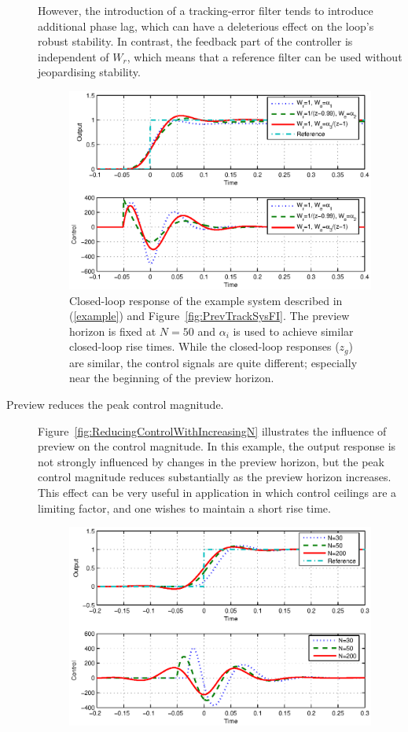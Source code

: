 \documentclass[a4paper,12pt]{article}
\theoremstyle{remark}
\begin{document}
\begin{description}
However, the introduction of a tracking-error filter tends to introduce additional phase lag, which can have a deleterious effect on the loop's robust stability. In contrast, the feedback part of the controller is independent of $W_r$, which means that a reference filter can be used without jeopardising stability.  
\begin{figure}
\begin{center}
\includegraphics[width=\columnwidth]{./Fig_11.eps}
\end{center}	
\caption{Closed-loop response of the example system described in (\ref{example}) and Figure~\ref{fig:PrevTrackSysFI}. The preview horizon is fixed at $N=50$ and $\alpha_i$ is used to achieve similar closed-loop rise times. While the closed-loop responses ($z_g$) are similar, the control signals are quite different; especially near the beginning of the preview horizon. \label{fig:CompWzWrNormForSimilarResp}}
\end{figure}
\item[Preview reduces the peak control magnitude.] 
Figure~\ref{fig:ReducingControlWithIncreasingN} illustrates the influence of preview on the control magnitude. In this example, the output response is not strongly influenced by changes in the preview horizon, but the peak control magnitude reduces substantially as the preview horizon increases. This effect can be very useful in application in which control ceilings are a limiting factor, and one wishes to maintain a short rise time.
\begin{figure}
\includegraphics[width=\columnwidth]{./Fig_12.eps}

\end{figure}
\end{description}
\end{document}
